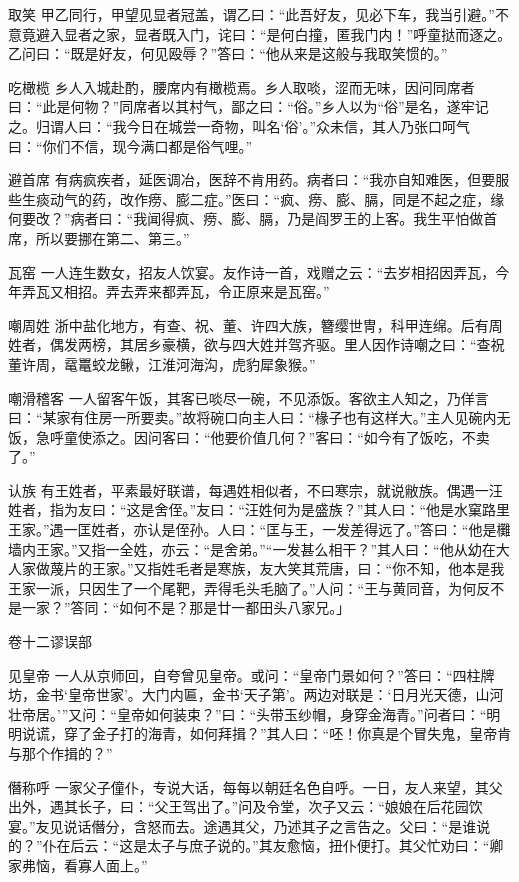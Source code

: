 \documentclass[12pt,UTF8]{ctexbook}
\begin{document}
取笑
甲乙同行，甲望见显者冠盖，谓乙曰：“此吾好友，见必下车，我当引避。”不意竟避入显者之家，显者既入门，诧曰：“是何白撞，匿我门内！”呼童挞而逐之。乙问曰：“既是好友，何见殴辱？”答曰：“他从来是这般与我取笑惯的。”

吃橄榄
乡人入城赴酌，腰席内有橄榄焉。乡人取啖，涩而无味，因问同席者曰：“此是何物？”同席者以其村气，鄙之曰：“俗。”乡人以为“俗”是名，遂牢记之。归谓人曰：“我今日在城尝一奇物，叫名‘俗’。”众未信，其人乃张口呵气曰：“你们不信，现今满口都是俗气哩。”

避首席
有病疯疾者，延医调冶，医辞不肯用药。病者曰：“我亦自知难医，但要服些生痰动气的药，改作痨、膨二症。”医曰：“疯、痨、膨、膈，同是不起之症，缘何要改？”病者曰：“我闻得疯、痨、膨、膈，乃是阎罗王的上客。我生平怕做首席，所以要挪在第二、第三。”

瓦窑
一人连生数女，招友人饮宴。友作诗一首，戏赠之云：“去岁相招因弄瓦，今年弄瓦又相招。弄去弄来都弄瓦，令正原来是瓦窑。”

嘲周姓
浙中盐化地方，有查、祝、董、许四大族，簪缨世冑，科甲连绵。后有周姓者，偶发两榜，其居乡豪横，欲与四大姓并驾齐驱。里人因作诗嘲之曰：“查祝董许周，鼋鼍蛟龙鳅，江淮河海沟，虎豹犀象猴。”

嘲滑稽客
一人留客午饭，其客已啖尽一碗，不见添饭。客欲主人知之，乃佯言曰：“某家有住房一所要卖。”故将碗口向主人曰：“椽子也有这样大。”主人见碗内无饭，急呼童使添之。因问客曰：“他要价值几何？”客曰：“如今有了饭吃，不卖了。”

认族
有王姓者，平素最好联谱，每遇姓相似者，不曰寒宗，就说敝族。偶遇一汪姓者，指为友曰：“这是舍侄。”友曰：“汪姓何为是盛族？”其人曰：“他是水窠路里王家。”遇一匡姓者，亦认是侄孙。人曰：“匡与王，一发差得远了。”答曰：“他是㰙墙内王家。”又指一全姓，亦云：“是舍弟。”“一发甚么相干？”其人曰：“他从幼在大人家做蔑片的王家。”又指姓毛者是寒族，友大笑其荒唐，曰：“你不知，他本是我王家一派，只因生了一个尾靶，弄得毛头毛脑了。”人问：“王与黄同音，为何反不是一家？”答同：“如何不是？那是廿一都田头八家兄。」

卷十二谬误部

见皇帝
一人从京师回，自夸曾见皇帝。或问：“皇帝门景如何？”答曰：“四柱牌坊，金书‘皇帝世家’。大门内匾，金书‘天子第’。两边对联是：‘日月光天德，山河壮帝居。’”又问：“皇帝如何装束？”曰：“头带玉纱帽，身穿金海青。”问者曰：“明明说谎，穿了金子打的海青，如何拜揖？”其人曰：“呸！你真是个冒失鬼，皇帝肯与那个作揖的？”

僭称呼
一家父子僮仆，专说大话，每每以朝廷名色自呼。一日，友人来望，其父出外，遇其长子，曰：“父王驾出了。”问及令堂，次子又云：“娘娘在后花园饮宴。”友见说话僭分，含怒而去。途遇其父，乃述其子之言告之。父曰：“是谁说的？”仆在后云：“这是太子与庶子说的。”其友愈恼，扭仆便打。其父忙劝曰：“卿家弗恼，看寡人面上。”
\end{document}
